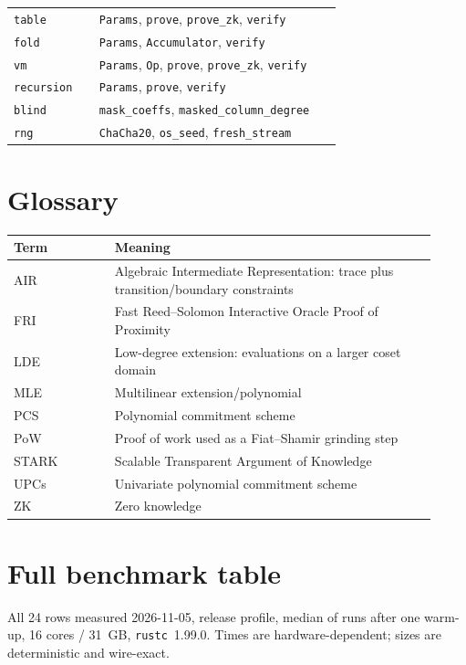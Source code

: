 \documentclass[11pt,a4paper]{article}
\begin{document}
\begin{longtable}{@{}L{0.24\linewidth}L{0.68\linewidth}@{}}
\texttt{table} & \texttt{Params}, \texttt{prove}, \texttt{prove\_zk}, \texttt{verify} \\
\texttt{fold} & \texttt{Params}, \texttt{Accumulator}, \texttt{verify} \\
\texttt{vm} & \texttt{Params}, \texttt{Op}, \texttt{prove}, \texttt{prove\_zk}, \texttt{verify} \\
\texttt{recursion} & \texttt{Params}, \texttt{prove}, \texttt{verify} \\
\texttt{blind} & \texttt{mask\_coeffs}, \texttt{masked\_column\_degree} \\
\texttt{rng} & \texttt{ChaCha20}, \texttt{os\_seed}, \texttt{fresh\_stream} \\
\bottomrule
\end{longtable}

\section{Glossary}

\begin{longtable}{@{}L{0.22\linewidth}L{0.70\linewidth}@{}}
\toprule
Term & Meaning \\
\midrule
\endhead
AIR & Algebraic Intermediate Representation: trace plus transition/boundary constraints \\
FRI & Fast Reed--Solomon Interactive Oracle Proof of Proximity \\
LDE & Low-degree extension: evaluations on a larger coset domain \\
MLE & Multilinear extension/polynomial \\
PCS & Polynomial commitment scheme \\
PoW & Proof of work used as a Fiat--Shamir grinding step \\
STARK & Scalable Transparent Argument of Knowledge \\
UPCs & Univariate polynomial commitment scheme \\
ZK & Zero knowledge \\
\bottomrule
\end{longtable}


\section{Full benchmark table}

All 24 rows measured 2026-11-05, release profile, median of runs after one
warm-up, 16 cores / 31~GB, \texttt{rustc}~1.99.0. Times are
hardware-dependent; sizes are deterministic and wire-exact.
\end{document}
